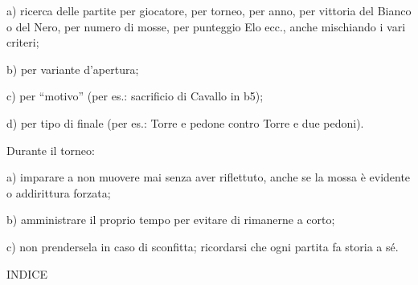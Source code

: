 a) ricerca delle partite per giocatore, per torneo, per anno, per
vittoria del Bianco o del Nero, per numero di mosse, per punteggio Elo
ecc., anche mischiando i vari criteri;

b) per variante d'apertura;

c) per ``motivo'' (per es.: sacrificio di Cavallo in b5);

d) per tipo di finale (per es.: Torre e pedone contro Torre e due
pedoni).

Durante il torneo:

a) imparare a non muovere mai senza aver riflettuto, anche se la mossa è
evidente o addirittura forzata;

b) amministrare il proprio tempo per evitare di rimanerne a corto;

c) non prendersela in caso di sconfitta; ricordarsi che ogni partita fa
storia a sé.

\clearpage
\onecolumn
INDICE

